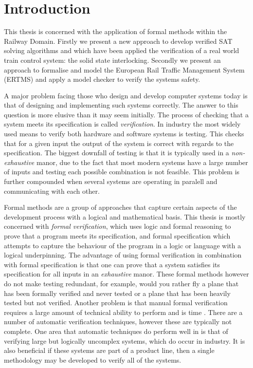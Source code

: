 

\section{Introduction}

This thesis is concerned with the application of formal methods within the Railway Domain. Firstly we present a new approach to develop verified SAT solving algorithms and which have been applied the verification of a real world train control system: the solid state interlocking. Secondly we present an approach to formalise and model the European Rail Traffic Management System (ERTMS) and apply a model checker to verify the systems safety.

A major problem facing those who design and develop computer systems today is  that of designing and implementing such systems correctly. The answer to this question is more elusive than it may seem initially. The process of checking that a system meets its specification is called \emph{verification}. In industry the most widely used means to verify both hardware and software systems is testing. This checks that for a given input the output of the system is correct with regards to the specification. The biggest downfall of testing is that it is typically used in a \emph{non-exhaustive} manor, due to the fact that most modern systems have a large number of inputs and testing each possible combination is not feasible. This problem is further compounded when several systems are operating in paralell and communicating with each other.

Formal methods are a group of approaches that capture certain aspects of the development process with a logical and mathematical basis. This thesis is mostly concerned with \emph{formal verification}, which uses logic and formal reasoning to prove that a program meets its specification, and formal specification which attempts to capture the behaviour of the program in a logic or language with a logical underpinning. The advantage of using formal verification in combination with formal specification is that one can prove that a system satisfies its specification for all inputs in an \emph{exhaustive} manor. These formal methods however do not make testing redundant, for example, would you rather fly a plane that has been formally verified and never tested or a plane that has been heavily tested but not verified. Another problem is that manual formal verification requires a large amount of technical ability to perform and is time . There are a number of automatic verification techniques, however these are typically not complete. One area that automatic techniques do perform well in is that of verifying large but logically uncomplex systems, which do occur in industry. It is also beneficial if these systems are part of a product line, then a single methodology may be developed to verify all of the systems. 

